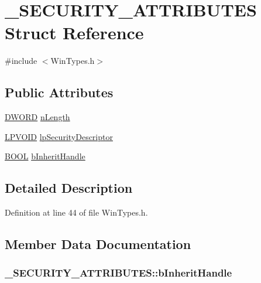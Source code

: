 \hypertarget{struct__SECURITY__ATTRIBUTES}{
\section{\_\-SECURITY\_\-ATTRIBUTES Struct Reference}
\label{struct__SECURITY__ATTRIBUTES}
}


{\ttfamily \#include $<$WinTypes.h$>$}\subsection*{Public Attributes}
\begin{DoxyCompactItemize}
\item 
\hyperlink{LALUsbx64_2include_2WinTypes_8h_ad342ac907eb044443153a22f964bf0af}{DWORD} \hyperlink{struct__SECURITY__ATTRIBUTES_a3ec25c40b65a92b164177b0b230abda9}{nLength}
\item 
\hyperlink{LALUsbx64_2include_2WinTypes_8h_a98428a03b263db9d26c25c53459c542f}{LPVOID} \hyperlink{struct__SECURITY__ATTRIBUTES_a90d1d49f7d2d50b24cc74c5060ae6204}{lpSecurityDescriptor}
\item 
\hyperlink{LALUsbx64_2include_2WinTypes_8h_a050c65e107f0c828f856a231f4b4e788}{BOOL} \hyperlink{struct__SECURITY__ATTRIBUTES_a8d91cd71bb0dfe51061c2412849dff98}{bInheritHandle}
\end{DoxyCompactItemize}


\subsection{Detailed Description}


Definition at line 44 of file WinTypes.h.

\subsection{Member Data Documentation}
\hypertarget{struct__SECURITY__ATTRIBUTES_a8d91cd71bb0dfe51061c2412849dff98}{
\subsubsection[{bInheritHandle}]{ {\bf \_\-SECURITY\_\-ATTRIBUTES::bInheritHandle}}}
\label{struct__SECURITY__ATTRIBUTES_a8d91cd71bb0dfe51061c2412849dff98}


